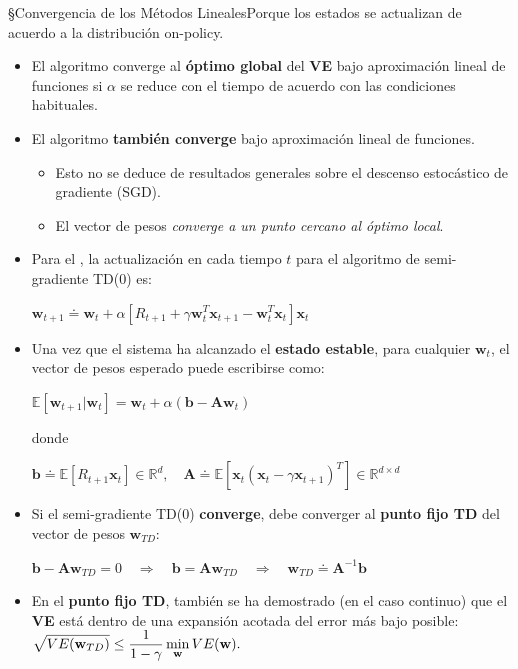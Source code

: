 \documentclass[10pt, envcountsect, handout, aspectratio=1610, hyperref={hypertexnames=true}]{beamer}
\begin{document}
\begin{frame}{\S Convergencia de los Métodos Lineales}{Porque los estados se actualizan de acuerdo a la distribución on-policy.}
	\begin{itemize}
		\item El algoritmo  converge al \textbf{óptimo global} del \textbf{VE} bajo aproximación lineal de funciones si $\alpha$ se reduce con el tiempo de acuerdo con las condiciones habituales.
	
		\item El algoritmo  \textbf{también converge} bajo aproximación lineal de funciones.
		\begin{itemize}
			\item Esto no se deduce de resultados generales sobre el descenso estocástico de gradiente (SGD).
			\item El vector de pesos \textit{converge a un punto cercano al óptimo local}.
		\end{itemize}
	
		\item Para el , la actualización en cada tiempo $t$ para el algoritmo de semi-gradiente TD(0) es:
		\centerline{\large$
		\mathbf{w}_{t+1} \doteq \mathbf{w}_t + \alpha \left[ R_{t+1} + \gamma \mathbf{w}_t^T \mathbf{x}_{t+1} - \mathbf{w}_t^T \mathbf{x}_t \right] \mathbf{x}_t 
		$}
	
		\item Una vez que el sistema ha alcanzado el \textbf{estado estable}, para cualquier $\mathbf{w}_t$, el vector de pesos esperado puede escribirse como:
		
		\centerline{\large $
		\mathbb{E}[\mathbf{w}_{t+1} | \mathbf{w}_t ] = \mathbf{w}_t + \alpha \left( \mathbf{b} - \mathbf{A} \mathbf{w}_t \right)
		$} donde
		
		\centerline{ 
		$\mathbf{b} \doteq \mathbb{E}[R_{t+1}\mathbf{x}_t] \in \mathbb{R}^d, \quad \mathbf{A} \doteq \mathbb{E}\left[\mathbf{x}_t(\mathbf{x}_t - \gamma \mathbf{x}_{t+1})^T\right] \in \mathbb{R}^{d \times d} 
		$}
		
		\item Si el semi-gradiente TD(0) \textbf{converge}, debe converger al \textbf{punto fijo TD} del vector de pesos $\mathbf{w}_{TD}$:
		
			\centerline{ 
				$\mathbf{b} - \mathbf{A}\mathbf{w}_{TD} = 0 \quad
					\Rightarrow \quad
					\mathbf{b} = \mathbf{A}\mathbf{w}_{TD} \quad
					\Rightarrow \quad
					\mathbf{w}_{TD} \doteq \mathbf{A}^{-1}\mathbf{b} 
				$}
	
		\item En el \textbf{punto fijo TD}, también se ha demostrado (en el caso continuo) que el \textbf{VE} está dentro de una expansión acotada del error más bajo posible:
		$\displaystyle
		\sqrt{VE(\mathbf{w}_{TD})} \leq \frac{1}{1-\gamma} \min_{\mathbf{w}} VE(\mathbf{w}).
		$
	\end{itemize}

	
	
\end{frame}
\end{document}
